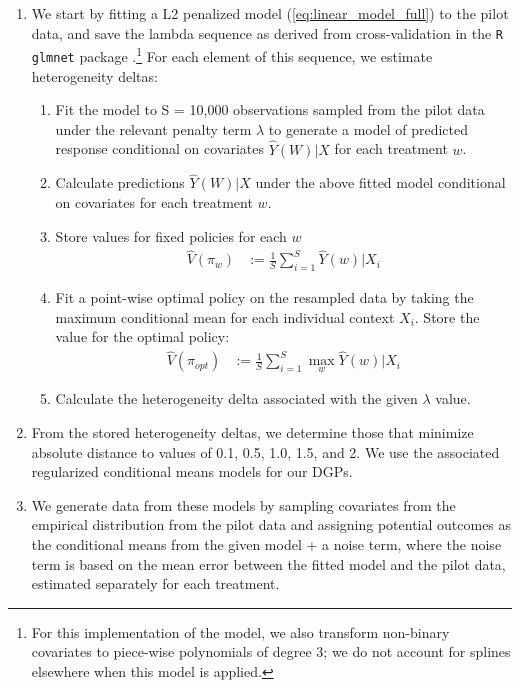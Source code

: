 \documentclass[letterpaper, 12pt, parskip=full,DIV=10]{scrartcl}
\begin{document}
\begin{enumerate}
\item  We start by fitting a L2 penalized model (\ref{eq:linear_model_full}) to the pilot data, and save the lambda sequence as derived from cross-validation in the \texttt{R} \texttt{glmnet} package \citep{simon2011regularization}.\footnote{{For this implementation of the model, we also transform non-binary covariates to piece-wise polynomials of degree 3; we do not account for splines elsewhere when this model is applied.}}  For each element of this sequence, we estimate heterogeneity deltas:
\begin{enumerate}
\item Fit the model to S = 10,000 observations sampled from the pilot data under the relevant penalty term $\lambda$ to generate a model of predicted response conditional on covariates $\hat{Y}(W) | X$ for each treatment $w$.
  \item Calculate predictions $\hat{Y}(W) | X$ under the above fitted model conditional on covariates %
  for each treatment $w$. 
  \item Store values for fixed policies for each $w$
      \begin{align}
          \hat{V}({\pi}_{w})  &:= \frac{1}{S} \sum_{i = 1}^S \hat{Y}(w) | X_i 
          \end{align}
  \item Fit a point-wise optimal policy on the resampled data by taking the maximum conditional mean for each individual context $X_i$. Store the value for the optimal policy:
    \begin{align}
      \hat{V}({\pi}_{opt})  &:= \frac{1}{S} \sum_{i = 1}^S \max_{ w } \hat{Y}(w) | X_i
          \end{align}
 \item Calculate the heterogeneity delta associated with the given $\lambda$ value. 
\end{enumerate}
\item From the stored heterogeneity deltas, we determine those that minimize absolute distance to values of 0.1, 0.5, 1.0, 1.5, and 2.  We use the associated regularized conditional means models for our DGPs.  
\item We generate data from these models by sampling covariates from the empirical distribution from the pilot data and assigning potential outcomes as the conditional means from the given model + a noise term, where the noise term is based on the mean error between the fitted model and the pilot data, estimated separately for each treatment. 
\end{enumerate}
\end{document}
